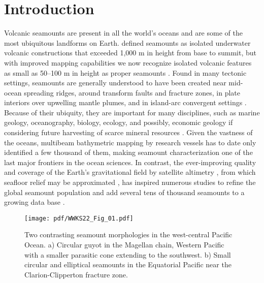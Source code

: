 %

\section{Introduction}
Volcanic seamounts are present in all the world's oceans and are some of the most ubiquitous
landforms on Earth. \citet{M1964} defined seamounts as isolated underwater volcanic constructions
that exceeded 1,000 m in height from base to summit, but with improved mapping capabilities we now
recognize isolated volcanic features as small as 50–100 m in height as proper seamounts \citep[e.g.,~][]{SC1990}.
Found in many tectonic settings, seamounts are generally understood to have been created near mid-ocean
spreading ridges, around transform faults and fracture zones, in plate interiors over upwelling
mantle plumes, and in island-arc convergent settings
\citep[e.g.,~][]{SC2010}. Because of their ubiquity, they are important for many disciplines, such as
marine geology, oceanography, biology, ecology, and possibly, economic geology if considering future harvesting of
scarce mineral resources \citep[e.g.,~][]{WSK2010,WK2010}. Given the vastness of the oceans, multibeam bathymetric
mapping by research vessels has to date only identified a few thousand of them, making seamount
characterization one of the last major frontiers in the ocean sciences. In contrast, the ever-improving
quality and coverage of the Earth's gravitational field by
satellite altimetry \citep[e.g.,~][]{Setal2021}, from which seafloor relief may be approximated
\citep[e.g.,~][]{SS1997}, has inspired numerous studies to refine the global seamount population and add several
tens of thousand seamounts to a growing data base \citep{CS1988,WL1997,W2001,KL2004,KW2011,G2022}. 
\begin{figure}
\centering
\noindent \texttt{[image: pdf/WWKS22\_Fig\_01.pdf]}
\caption{Two contrasting seamount morphologies in the west-central Pacific Ocean. a) Circular guyot in the Magellan chain,
Western Pacific with a smaller parasitic cone extending to the southwest. b) Small circular and
elliptical seamounts in the Equatorial Pacific near the Clarion-Clipperton fracture zone.}
\label{WWKS22_Fig_01}
\end{figure}

